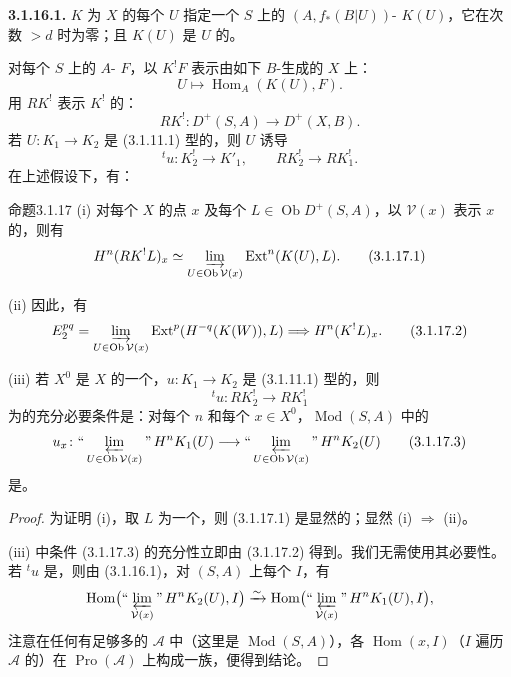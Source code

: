 \textbf{3.1.16.1.} $K$ 为 $X$ 的每个 $U$ 指定一个 $S$ 上的 $(A,f_*(B|U))$- $K(U)$，它在次数 $>d$ 时为零；且 $K(U)$ 是 $U$ 的。

对每个 $S$ 上的 $A$- $F$，以 $K^!F$ 表示由如下 $B$-生成的 $X$ 上：
\[
 U\longmapsto\operatorname{Hom}_A(K(U),F).
\]
用 $RK^!$ 表示 $K^!$ 的：
\[
 RK^!\colon D^+(S,A)\longrightarrow D^+(X,B).
\]
若 $U\colon K_1\to K_2$ 是 (3.1.11.1) 型的，则 $U$ 诱导
\[
 {}^tu\colon K_2^!\longrightarrow K'_1,\qquad
 RK_2^!\longrightarrow RK_1^!.
\]
在上述假设下，有：

\begin{SGAresult}{命题}{3.1.17}
(i) 对每个 $X$ 的点 $x$ 及每个 $L\in\operatorname{Ob}D^+(S,A)$，以 $\mathcal V(x)$ 表示 $x$ 的，则有
\[
 H^n(RK^!L)_x\simeq\varinjlim_{U\in\operatorname{Ob}\mathcal V(x)}
 \operatorname{Ext}^n(K(U),L).\tag{3.1.17.1}
\]

(ii) 因此，有
\[
 E_2^{pq}=\varinjlim_{U\in\operatorname{Ob}\mathcal V(x)}
 \operatorname{Ext}^p(H^{-q}(K(W)),L)\Longrightarrow H^n(K^!L)_x.\tag{3.1.17.2}
\]

(iii) 若 $X^0$ 是 $X$ 的一个，$u\colon K_1\to K_2$ 是 (3.1.11.1) 型的，则
\[
 {}^tu\colon RK_2^!\longrightarrow RK_1^!
\]
为的充分必要条件是：对每个 $n$ 和每个 $x\in X^0$，$\operatorname{Mod}(S,A)$ 中的
\[
 u_x\colon\text{``}\varprojlim_{U\in\operatorname{Ob}\mathcal V(x)}\text{''}\,H^nK_1(U)
 \longrightarrow\text{``}\varprojlim_{U\in\operatorname{Ob}\mathcal V(x)}\text{''}\,H^nK_2(U)\tag{3.1.17.3}
\]
是。
\end{SGAresult}
\begin{proof}
为证明 (i)，取 $L$ 为一个，则 (3.1.17.1) 是显然的；显然 (i) $\Rightarrow$ (ii)。

(iii) 中条件 (3.1.17.3) 的充分性立即由 (3.1.17.2) 得到。我们无需使用其必要性。若 ${}^tu$ 是，则由 (3.1.16.1)，对 $(S,A)$ 上每个 $I$，有
\[
\operatorname{Hom}\bigl(\text{``}\varprojlim_{\mathcal V(x)}\text{''}\,H^nK_2(U),I\bigr)
 \xrightarrow{\sim}
\operatorname{Hom}\bigl(\text{``}\varprojlim_{\mathcal V(x)}\text{''}\,H^nK_1(U),I\bigr),
\]
注意在任何有足够多的 $\mathscr A$ 中（这里是 $\operatorname{Mod}(S,A)$），各 $\operatorname{Hom}(x,I)$（$I$ 遍历 $\mathscr A$ 的）在 $\operatorname{Pro}(\mathscr A)$ 上构成一族，便得到结论。
\end{proof}

